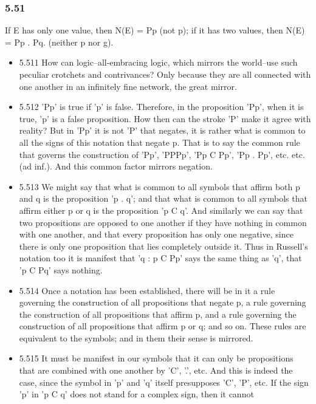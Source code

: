 \documentclass[11pt]{article}
\begin{document}
\subsubsection*{5.51}
\label{sec:orgf011931}
If E has only one value, then N(E) = Pp (not p); if it has two values,
then N(E) = Pp . Pq. (neither p nor g).
\begin{itemize}
\item 5.511
\label{sec:orga535ee2}
How can logic--all-embracing logic, which mirrors the world--use such
peculiar crotchets and contrivances? Only because they are all connected
with one another in an infinitely fine network, the great mirror.
\item 5.512
\label{sec:orga5a504f}
'Pp' is true if 'p' is false. Therefore, in the proposition 'Pp',
when it is true, 'p' is a false proposition. How then can the stroke 'P'
make it agree with reality? But in 'Pp' it is not 'P' that negates, it is
rather what is common to all the signs of this notation that negate p. That
is to say the common rule that governs the construction of 'Pp', 'PPPp',
'Pp C Pp', 'Pp . Pp', etc. etc. (ad inf.). And this common factor mirrors
negation.
\item 5.513
\label{sec:org211b873}
We might say that what is common to all symbols that affirm both p
and q is the proposition 'p . q'; and that what is common to all symbols
that affirm either p or q is the proposition 'p C q'. And similarly we can
say that two propositions are opposed to one another if they have nothing
in common with one another, and that every proposition has only one
negative, since there is only one proposition that lies completely outside
it. Thus in Russell's notation too it is manifest that 'q : p C Pp' says
the same thing as 'q', that 'p C Pq' says nothing.
\item 5.514
\label{sec:org82897ac}
Once a notation has been established, there will be in it a rule
governing the construction of all propositions that negate p, a rule
governing the construction of all propositions that affirm p, and a rule
governing the construction of all propositions that affirm p or q; and so
on. These rules are equivalent to the symbols; and in them their sense is
mirrored.
\item 5.515
\label{sec:org6a9afae}
It must be manifest in our symbols that it can only be propositions
that are combined with one another by 'C', '.', etc. And this is indeed the
case, since the symbol in 'p' and 'q' itself presupposes 'C', 'P', etc. If
the sign 'p' in 'p C q' does not stand for a complex sign, then it cannot

\end{itemize}
\end{document}
